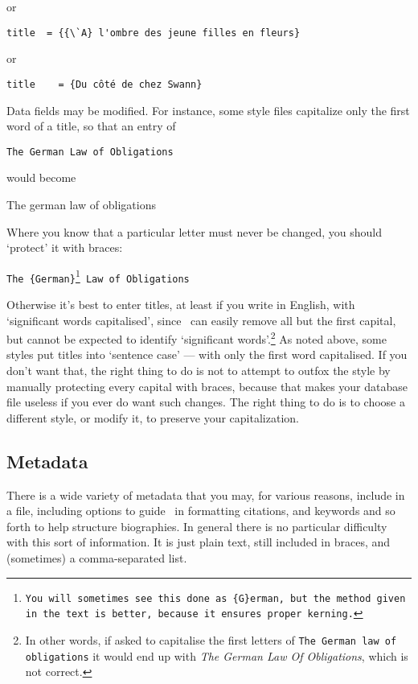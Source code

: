 {\begin{center}
or

\verb|title  = {{\`A} l'ombre des jeune filles en fleurs}|

or

\verb|title    = {Du côté de chez Swann}|
\end{center}

Data fields may be modified. For instance, some style files capitalize only the first word of a title, so that an entry of
\begin{center}
\verb|The German Law of Obligations|
\end{center}
would become
\begin{center}
The german law of obligations
\end{center}
Where you know that a particular letter must never be changed, you should `protect' it with braces:
\begin{center}
\texttt{The \{German\}\footnote{You will sometimes see this done as \texttt{\{G\}erman}, but the method given in the text is better, because it ensures proper kerning.} Law of Obligations}
\end{center}
Otherwise it's best to enter titles, at least if you write in English, with `significant words capitalised', since \biblatex\ can easily remove all but the first capital, but cannot be expected to identify `significant words'.\footnote{In other words, if asked to capitalise the first letters of \texttt{The German law of obligations} it would end up with \emph{The German Law Of Obligations}, which is not correct.} As noted above, some styles put titles into `sentence case' --- with only the first word capitalised. If you don't want that, the right thing to do is not to attempt to outfox the style by manually protecting every capital with braces, because that makes your database file useless if you ever do want such changes. The right thing to do is to choose a different style, or modify it, to preserve your capitalization.

\subsection{Metadata}

There is a wide variety of metadata that you may, for various reasons, include in a file, including options to guide \biblatex\ in formatting citations, and keywords and so forth to help structure biographies. In general there is no particular difficulty with this sort of information. It is just plain text, still included in braces, and (sometimes) a comma-separated list.

}
